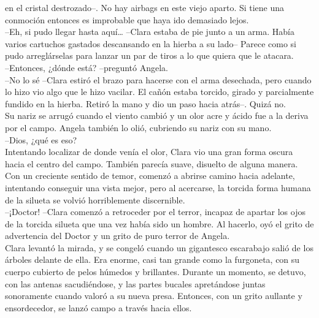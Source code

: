 en el cristal destrozado--. No hay airbags en este viejo aparto. Si
tiene una conmoción entonces es improbable que haya ido demasiado
lejos.\\
--Eh, si pudo llegar hasta aquí\ldots{} --Clara estaba de pie junto a un
arma. Había varios cartuchos gastados descansando en la hierba a su
lado-- Parece como si pudo arreglárselas para lanzar un par de tiros a
lo que quiera que le atacara.\\
--Entonces, ¿dónde está? --preguntó Angela.\\
--No lo sé --Clara estiró el brazo para hacerse con el arma desechada,
pero cuando lo hizo vio algo que le hizo vacilar. El cañón estaba
torcido, girado y parcialmente fundido en la hierba. Retiró la mano y
dio un paso hacia atrás--. Quizá no.\\
Su nariz se arrugó cuando el viento cambió y un olor acre y ácido fue a
la deriva por el campo. Angela también lo olió, cubriendo su nariz con
su mano.\\
--Dios, ¿qué es eso?\\
Intentando localizar de donde venía el olor, Clara vio una gran forma
oscura hacia el centro del campo. También parecía suave, disuelto de
alguna manera. Con un creciente sentido de temor, comenzó a abrirse
camino hacia adelante, intentando conseguir una vista mejor, pero al
acercarse, la torcida forma humana de la silueta se volvió horriblemente
discernible.\\
--¡Doctor! --Clara comenzó a retroceder por el terror, incapaz de
apartar los ojos de la torcida silueta que una vez había sido un hombre.
Al hacerlo, oyó el grito de advertencia del Doctor y un grito de puro
terror de Angela.\\
Clara levantó la mirada, y se congeló cuando un gigantesco escarabajo
salió de los árboles delante de ella. Era enorme, casi tan grande como
la furgoneta, con su cuerpo cubierto de pelos húmedos y brillantes.
Durante un momento, se detuvo, con las antenas sacudiéndose, y las
partes bucales apretándose juntas sonoramente cuando valoró a su nueva
presa. Entonces, con un grito aullante y ensordecedor, se lanzó campo a
través hacia ellos.\\

